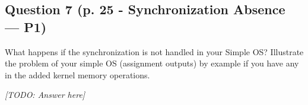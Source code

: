 \documentclass[11pt,a4paper]{article}
\begin{document}
\subsection{Question 7 (p. 25 - Synchronization Absence — P1)}
What happens if the synchronization is not handled in your Simple OS? Illustrate the problem of your simple OS (assignment outputs) by example if you have any in the added kernel memory operations.
\par\noindent\textit{[TODO: Answer here]}
\end{document}
